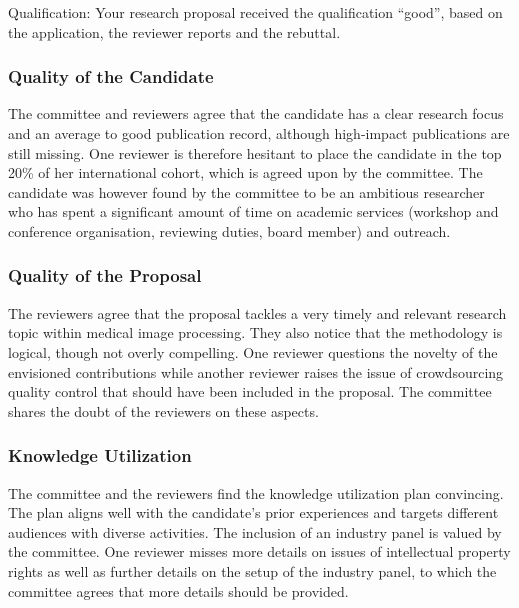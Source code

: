 \documentclass[serif, twocolumn, numeric, rga]{jote-article}
\begin{document}
\noindent Qualification: Your research proposal received the qualification “good”, based on the application, the reviewer reports and the rebuttal.
 {}\subsubsection*{Quality of the Candidate} 
The committee and reviewers agree that the candidate has a clear research focus and an average to good publication record, although high-impact publications are still missing. One reviewer is therefore hesitant to place the candidate in the top 20\% of her international cohort, which is agreed upon by the committee. The candidate was however found by the committee to be an ambitious researcher who has spent a significant amount of time on academic services (workshop and conference organisation, reviewing duties, board member) and outreach.
 {}\subsubsection*{Quality of the Proposal} 
The reviewers agree that the proposal tackles a very timely and relevant research topic within medical image processing. They also notice that the methodology is logical, though not overly compelling. One reviewer questions the novelty of the envisioned contributions while another reviewer raises the issue of crowdsourcing quality control that should have been included in the proposal. The committee shares the doubt of the reviewers on these aspects.
 {}\subsubsection*{Knowledge Utilization} 
The committee and the reviewers find the knowledge utilization plan convincing. The plan aligns well with the candidate’s prior experiences and targets different audiences with diverse activities. The inclusion of an industry panel is valued by the committee. One reviewer misses more details on issues of intellectual property rights as well as further details on the setup of the industry panel, to which the committee agrees that more details should be provided.


\printbibliography
\end{document}
